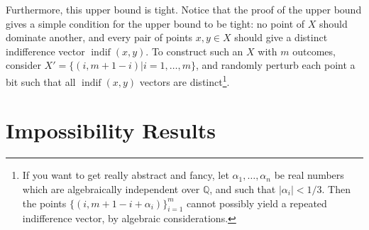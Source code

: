 \documentclass[12pt]{article}
\DeclareMathOperator*{\indif}{indif}
\newcommand{\1}[1]{\mathds{1}[{#1}]}
\begin{document}
  Furthermore, this upper bound is tight.
  Notice that the proof of the upper bound gives a simple condition for the
  upper bound to be tight: no point of $X$ should dominate another,
  and every pair of points $x,y\in X$ should give a distinct indifference
  vector $\indif(x,y)$.
  To construct such an $X$ with $m$ outcomes, consider
  $X' = \{ (i,m + 1 - i) | i=1,\ldots,m \}$, and randomly perturb each point a
  bit such that all $\indif(x,y)$ vectors are distinct\footnote{
    If you want to get really abstract and fancy, let
    $\alpha_1,\ldots, \alpha_n$ be real numbers which are
    algebraically independent over $\mathbb Q$, and such that
    $|\alpha_i| < 1/3$. Then the points $\{(i,m + 1 - i + \alpha_i)\}_{i=1}^m$
    cannot possibly yield a repeated indifference vector, by
    algebraic considerations.
  }.

\section{Impossibility Results}
\end{document}
